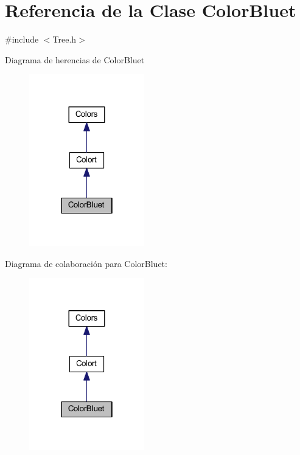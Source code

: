 \hypertarget{class_color_bluet}{}\section{Referencia de la Clase Color\+Bluet}
\label{class_color_bluet}


{\ttfamily \#include $<$Tree.\+h$>$}



Diagrama de herencias de Color\+Bluet
\nopagebreak
\begin{figure}[H]
\begin{center}
\leavevmode
\includegraphics[width=142pt]{class_color_bluet__inherit__graph}
\end{center}
\end{figure}


Diagrama de colaboración para Color\+Bluet\+:
\nopagebreak
\begin{figure}[H]
\begin{center}
\leavevmode
\includegraphics[width=142pt]{class_color_bluet__coll__graph}
\end{center}
\end{figure}
